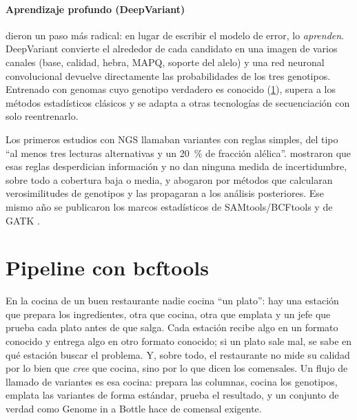 \paragraph{Aprendizaje profundo (DeepVariant)} \textcite{c09-poplin2018} dieron un paso más radical: en lugar de escribir el modelo de error, lo \emph{aprenden}. DeepVariant convierte el  alrededor de cada candidato en una imagen de varios canales (base, calidad, hebra, MAPQ, soporte del alelo) y una red neuronal convolucional devuelve directamente las probabilidades de los tres genotipos. Entrenado con genomas cuyo genotipo verdadero es conocido (\cref{sec:09-bcftools}), supera a los métodos estadísticos clásicos y se adapta a otras tecnologías de secuenciación con solo reentrenarlo.

\begin{historia}
Los primeros estudios con NGS llamaban variantes con reglas simples, del tipo ``al menos tres lecturas alternativas y un \SI{20}{\percent} de fracción alélica''. \textcite{c09-nielsen2011} mostraron que esas reglas desperdician información y no dan ninguna medida de incertidumbre, sobre todo a cobertura baja o media, y abogaron por métodos que calcularan verosimilitudes de genotipos y las propagaran a los análisis posteriores. Ese mismo año se publicaron los marcos estadísticos de SAMtools/BCFtools \parencite{c09-li2011stat} y de GATK \parencite{c09-depristo2011}.
\end{historia}

\section{Pipeline con bcftools}\label{sec:09-bcftools}

\begin{intuicion}
En la cocina de un buen restaurante nadie cocina ``un plato'': hay una estación que prepara los ingredientes, otra que cocina, otra que emplata y un jefe que prueba cada plato antes de que salga. Cada estación recibe algo en un formato conocido y entrega algo en otro formato conocido; si un plato sale mal, se sabe en qué estación buscar el problema. Y, sobre todo, el restaurante no mide su calidad por lo bien que \emph{cree} que cocina, sino por lo que dicen los comensales. Un flujo de llamado de variantes es esa cocina:  prepara las columnas,  cocina los genotipos,  emplata las variantes de forma estándar,  prueba el resultado, y un conjunto de verdad como Genome in a Bottle hace de comensal exigente.
\end{intuicion}

